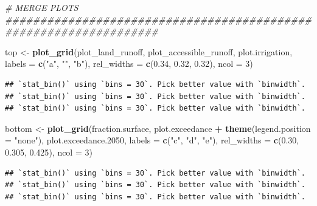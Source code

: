 \documentclass[
  11pt,
]{article}
\newenvironment{Shaded}{\begin{snugshade}}{\end{snugshade}}
\newcommand{\AttributeTok}[1]{\textcolor[rgb]{0.13,0.29,0.53}{#1}}
\newcommand{\CommentTok}[1]{\textcolor[rgb]{0.56,0.35,0.01}{\textit{#1}}}
\newcommand{\DecValTok}[1]{\textcolor[rgb]{0.00,0.00,0.81}{#1}}
\newcommand{\FloatTok}[1]{\textcolor[rgb]{0.00,0.00,0.81}{#1}}
\newcommand{\FunctionTok}[1]{\textcolor[rgb]{0.13,0.29,0.53}{\textbf{#1}}}
\newcommand{\NormalTok}[1]{#1}
\newcommand{\OtherTok}[1]{\textcolor[rgb]{0.56,0.35,0.01}{#1}}
\newcommand{\SpecialCharTok}[1]{\textcolor[rgb]{0.81,0.36,0.00}{\textbf{#1}}}
\newcommand{\StringTok}[1]{\textcolor[rgb]{0.31,0.60,0.02}{#1}}
\begin{document}
\begin{Shaded}
\begin{Highlighting}[]
\CommentTok{\# MERGE PLOTS \#\#\#\#\#\#\#\#\#\#\#\#\#\#\#\#\#\#\#\#\#\#\#\#\#\#\#\#\#\#\#\#\#\#\#\#\#\#\#\#\#\#\#\#\#\#\#\#\#\#\#\#\#\#\#\#\#\#\#\#\#\#\#\#\#\#}

\NormalTok{top }\OtherTok{\textless{}{-}} \FunctionTok{plot\_grid}\NormalTok{(plot\_land\_runoff, plot\_accessible\_runoff, plot.irrigation, }
                 \AttributeTok{labels =} \FunctionTok{c}\NormalTok{(}\StringTok{"a"}\NormalTok{, }\StringTok{""}\NormalTok{, }\StringTok{"b"}\NormalTok{), }\AttributeTok{rel\_widths =} \FunctionTok{c}\NormalTok{(}\FloatTok{0.34}\NormalTok{, }\FloatTok{0.32}\NormalTok{, }\FloatTok{0.32}\NormalTok{), }\AttributeTok{ncol =} \DecValTok{3}\NormalTok{)}
\end{Highlighting}
\end{Shaded}

\begin{verbatim}
## `stat_bin()` using `bins = 30`. Pick better value with `binwidth`.
## `stat_bin()` using `bins = 30`. Pick better value with `binwidth`.
## `stat_bin()` using `bins = 30`. Pick better value with `binwidth`.
\end{verbatim}

\begin{Shaded}
\begin{Highlighting}[]
\NormalTok{bottom }\OtherTok{\textless{}{-}} \FunctionTok{plot\_grid}\NormalTok{(fraction.surface, plot.exceedance }\SpecialCharTok{+} 
                      \FunctionTok{theme}\NormalTok{(}\AttributeTok{legend.position =} \StringTok{"none"}\NormalTok{), plot.exceedance}\FloatTok{.2050}\NormalTok{, }
                    \AttributeTok{labels =} \FunctionTok{c}\NormalTok{(}\StringTok{"c"}\NormalTok{, }\StringTok{"d"}\NormalTok{, }\StringTok{"e"}\NormalTok{), }\AttributeTok{rel\_widths =} \FunctionTok{c}\NormalTok{(}\FloatTok{0.30}\NormalTok{, }\FloatTok{0.305}\NormalTok{, }\FloatTok{0.425}\NormalTok{), }\AttributeTok{ncol =} \DecValTok{3}\NormalTok{)}
\end{Highlighting}
\end{Shaded}

\begin{verbatim}
## `stat_bin()` using `bins = 30`. Pick better value with `binwidth`.
## `stat_bin()` using `bins = 30`. Pick better value with `binwidth`.
## `stat_bin()` using `bins = 30`. Pick better value with `binwidth`.
\end{verbatim}
\end{document}
